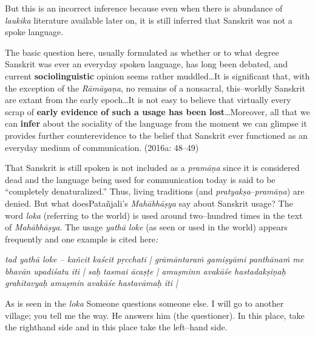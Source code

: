 But this is an incorrect inference because even when there is abundance of \textit{laukika} literature available later on, it is still inferred that Sanskrit was not a spoke language.

\begin{myquote}
The basic question here, usually formulated as whether or to what degree Sanskrit was ever an everyday spoken language, has long been debated, and current \textbf{sociolinguistic} opinion seems rather muddled…It is signiﬁcant that, with the exception of the \textit{Rāmāyaṇa}, no remains of a nonsacral, this–worldly Sanskrit are extant from the early epoch…It is not easy to believe that virtually every scrap of \textbf{early evidence of such a usage has been lost}…Moreover, all that we can \textbf{infer} about the sociality of the language from the moment we can glimpse it provides further counterevidence to the belief that Sanskrit ever functioned as an everyday medium of communication. (2016a: 48–49)
\end{myquote}

That Sanskrit is still spoken is not included as a \textit{pramāṇa} since it is considered dead and the language being used for communication today is said to be “completely denaturalized.” Thus, living traditions (and \textit{pratyakṣa}–\textit{pramāṇa}) are denied. But what doesPatañjali’s	 \textit{Mahābhāṣya} say about Sanskrit usage? The word \textit{loka} (referring to the world) is used around two–hundred times in the text of\textit{ Mahābhāṣya}. The usage \textit{yathā loke} (as seen or used in the world) appears frequently and one example is cited here\textit{:}

\vspace{.2cm}

\begin{myquote}
\textit{tad yathā loke – kañcit kaścit pṛcchati | grāmāntaraṁ gamiṣyāmi panthānaṁ me bhavān upadiśatu iti | saḥ tasmai ācaṣṭe | amuṣminn avakāśe hastadakṣiṇaḥ grahītavyaḥ amuṣmin avakāśe hastavāmaḥ iti |}
\end{myquote}

\vspace{.2cm}

\begin{myquote}
As is seen in the \textit{loka} Someone questions someone else. I will go to another village; you tell me the way. He answers him (the questioner). In this place, take the righthand side and in this place take the left–hand side.
\end{myquote}

